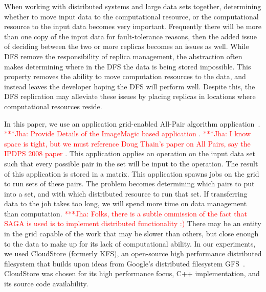 \documentclass[a4paper,11pt]{article}
\newcommand{\jhanote}[1]{ {\textcolor{red} { ***Jha: #1 }}}
\newcommand{\jhanote}[1]{}
\begin{document}
When working with distributed systems and large data sets together, determining whether to move input data to the computational resource, or the computational resource to the input data becomes very important. Frequently there will be more than one copy of the input data for fault-tolerance reasons, then the added issue of deciding between the two or more replicas becomes an issues as well. While DFS remove the responsibility of replica management, the abstraction often makes determining where in the DFS the data is being stored impossible. This property removes the ability to move computation resources to the data, and instead leaves the developer hoping the DFS will perform well. Despite this, the DFS replication may alleviate these issues by placing replicas in locations where computational resources reside.


In this paper, we use an application grid-enabled All-Pair algorithm application~\cite{Interop}.  \jhanote{Provide Details of the ImageMagic based application}. \jhanote{I know space is tight, but we must reference Doug Thain's 
paper on All Pairs, say the IPDPS 2008 paper}. This application applies an operation on the input data set such that every possible pair in the set will be input to the operation. The result of this application is stored in a matrix. This application spawns jobs on the grid to run sets of these pairs. The problem becomes determining which pairs to put into a set, and with which distributed resource to run that set. If transferring data to the job takes too long, we will spend more time on data management than computation. \jhanote{Folks, there is a subtle ommission of the fact that SAGA is used is to implement distributed functionality :)} There may be an entity in the grid capable of the work that may be slower than others, but close enough to the data to make up for its lack of computational ability. In our experiments, we used CloudStore (formerly KFS), an open-source high performance distributed filesystem that builds upon ideas from Google's distributed filesystem GFS~\cite{kfs_web}. CloudStore was chosen for its high performance focus, C++ implementation, and its source code availability.
\end{document}
